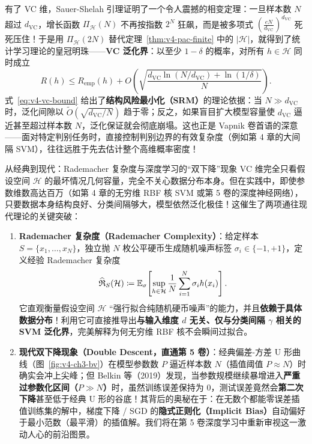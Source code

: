 有了 VC 维，Sauer-Shelah 引理证明了一个令人震撼的相变定理：一旦样本数 $N$ 超过 $d_{\mathrm{VC}}$，增长函数 $\Pi_{\mathcal{H}}(N)$ 不再按指数 $2^N$ 狂飙，而是被多项式 $\left(\frac{eN}{d_{\mathrm{VC}}}\right)^{d_{\mathrm{VC}}}$ 死死压住！于是用 $\Pi_{\mathcal{H}}(2N)$ 替代定理~\ref{thm:v4-pac-finite} 中的 $|\mathcal{H}|$，就得到了统计学习理论的皇冠明珠——\textbf{VC 泛化界}：以至少 $1-\delta$ 的概率，对所有 $h \in \mathcal{H}$ 同时成立
\begin{equation}\label{eq:v4-vc-bound}
  R(h) \le R_{\mathrm{emp}}(h) + O\!\left(\sqrt{\frac{d_{\mathrm{VC}}\ln(N / d_{\mathrm{VC}}) + \ln(1/\delta)}{N}}\right).
\end{equation}
式~\eqref{eq:v4-vc-bound} 给出了\textbf{结构风险最小化（SRM）}的理论依据：当 $N \gg d_{\mathrm{VC}}$ 时，泛化间隙以 $\tilde{O}(\sqrt{d_{\mathrm{VC}}/N})$ 趋于零；反之，如果盲目扩大模型容量使 $d_{\mathrm{VC}}$ 逼近甚至超过样本数 $N$，泛化保证就会彻底崩塌。这也正是 Vapnik 卷首语的深意——面对特定判别任务时，直接控制判别边界的有效复杂度（例如第 4 章的大间隔 SVM），往往远胜于先去估计整个高维概率密度！

\begin{extBox}{从经典到现代：Rademacher 复杂度与深度学习的“双下降”现象}
VC 维完全只看假设空间 $\mathcal{H}$ 的最坏情况几何容量，完全不关心数据分布本身。但在实践中，即使参数维数高达百万（如第 4 章的无穷维 RBF 核 SVM 或第 5 卷的深度神经网络），只要数据本身结构良好、分类间隔够大，模型依然泛化极佳！这催生了两项通往现代理论的关键突破：
\begin{enumerate}
  \item \textbf{Rademacher 复杂度（Rademacher Complexity）}：给定样本 $S = \{x_1, \dots, x_N\}$，独立抛 $N$ 枚公平硬币生成随机噪声标签 $\sigma_i \in \{-1, +1\}$，定义经验 Rademacher 复杂度
  \[
    \widehat{\mathfrak{R}}_S(\mathcal{H}) \coloneqq \mathbb{E}_{\sigma}\!\left[\sup_{h \in \mathcal{H}} \frac{1}{N}\sum_{i=1}^N \sigma_i h(x_i)\right].
  \]
  它直观衡量假设空间 $\mathcal{H}$ “强行拟合纯随机硬币噪声”的能力，并且\textbf{依赖于具体数据分布}！利用它可直接推导出\textbf{与输入维度 $d$ 无关、仅与分类间隔 $\gamma$ 相关的 SVM 泛化界}，完美解释为何无穷维 RBF 核不会瞬间过拟合。
  \item \textbf{现代双下降现象（Double Descent，直通第 5 卷）}：经典偏差-方差 U 形曲线（图~\ref{fig:v4-ch3-bv}）在模型参数数 $P$ 逼近样本数 $N$（插值阈值 $P \approx N$）时确实会冲上尖峰；但 Belkin 等（2019）发现，当参数规模继续暴增进入\textbf{严重过参数化区间（$P \gg N$）}时，虽然训练误差保持为 $0$，测试误差竟然会\textbf{第二次下降}甚至低于经典 U 形的谷底！其背后的奥秘在于：在无数个都能零误差插值训练集的解中，梯度下降 / SGD 的\textbf{隐式正则化（Implicit Bias）}自动偏好于最小范数（最平滑）的插值解。我们将在第 5 卷深度学习中重新审视这一激动人心的前沿图景。
\end{enumerate}
\end{extBox}


